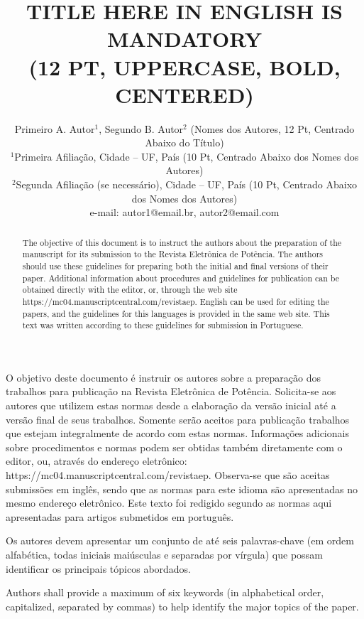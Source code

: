 \documentclass[portugues]{sobraep}
\title{TITLE HERE IN ENGLISH IS MANDATORY \\ (12 PT, UPPERCASE, BOLD, CENTERED)}
\author{Primeiro A. Autor$^{1}$, Segundo B. Autor$^{2}$ (Nomes dos Autores, 12 Pt, Centrado Abaixo do Título)\\
	\normalsize $^{1}$Primeira Afiliação, Cidade -- UF, País (10 Pt, Centrado Abaixo dos Nomes dos Autores)\\
	\normalsize $^{2}$Segunda Afiliação (se necessário), Cidade -- UF, País (10 Pt, Centrado Abaixo dos Nomes dos Autores)\\
	\normalsize e-mail: autor1@email.br, autor2@email.com
}
\begin{document}
\maketitle

\begin{resumo}
	O objetivo deste documento é instruir os autores sobre a preparação dos trabalhos para publicação na Revista Eletrônica de Potência. Solicita-se aos autores que utilizem estas normas desde a elaboração da versão inicial até a versão final de seus trabalhos. Somente serão aceitos para publicação trabalhos que estejam integralmente de acordo com estas normas. Informações adicionais sobre procedimentos e normas podem ser obtidas também diretamente com o editor, ou, através do endereço eletrônico: https://mc04.manuscriptcentral.com/revistaep. Observa-se que são aceitas submissões em inglês, sendo que as normas para este idioma são apresentadas no mesmo endereço eletrônico. Este texto foi redigido segundo as normas aqui apresentadas para artigos submetidos em português.
\end{resumo}

\begin{palavraschave }
	Os autores devem apresentar um conjunto de até seis palavras-chave (em ordem alfabética, todas iniciais maiúsculas e separadas por vírgula) que possam identificar os principais tópicos abordados.
\end{palavraschave }

\englishtitle

\begin{abstract}
	The objective of this document is to instruct the authors about the preparation of the manuscript for its submission to the Revista Eletrônica de Potência. The authors should use these guidelines for preparing both the initial and final versions of their paper. Additional information about procedures and guidelines for publication can be obtained directly with the editor, or, through the web site https://mc04.manuscriptcentral.com/revistaep. English can be used for editing the papers, and the guidelines for this languages is provided in the same web site. This text was written according to these guidelines for submission in Portuguese.
\end{abstract}

\begin{keywords}
	Authors shall provide a maximum of six keywords (in alphabetical order, capitalized, separated by commas) to help identify the major topics of the paper.
\end{keywords}
\end{document}
